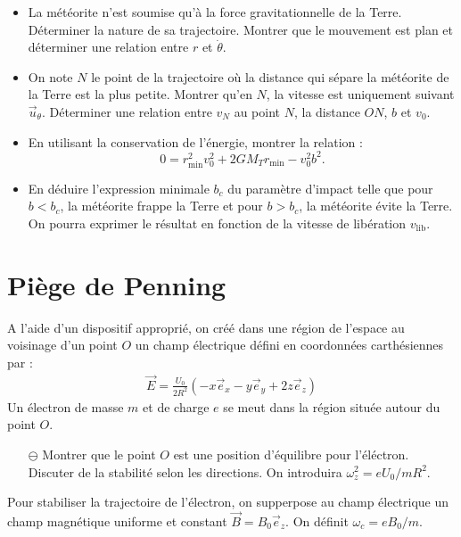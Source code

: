 \documentclass{report}
\begin{document}
\begin{itemize}
\item La météorite n'est soumise qu'à la force gravitationnelle de la Terre. Déterminer la nature de sa trajectoire. Montrer que le mouvement est plan et déterminer une relation entre $r$ et $\dot{\theta}$.
\item On note $N$ le point de la trajectoire où la distance qui sépare la météorite de la Terre est la plus petite. Montrer qu'en $N$, la vitesse est uniquement suivant $\vec{u}_\theta$. Déterminer une relation entre $v_N$ au point $N$, la distance $ON$, $b$ et $v_0$.
\item En utilisant la conservation de l'énergie, montrer la relation :
$$
0=r^2_\mathrm{min}v_0^2+2GM_Tr_\mathrm{min}-v_0^2b^2.
$$
\item En déduire l'expression minimale $b_c$ du paramètre d'impact telle que pour $b<b_c$, la météorite frappe la Terre et pour $b>b_c$, la météorite évite la Terre. On pourra exprimer le résultat en fonction de la vitesse de libération $v_\mathrm{lib}$.
\end{itemize}

\newpage

\section*{Piège de Penning}

A l'aide d'un dispositif approprié, on créé dans une région de l'espace au voisinage d'un point $O$ un champ électrique défini en coordonnées carthésiennes par :
\begin{align*}
	\vec{E}=\frac{U_0}{2R^2}\left(-x\vec{e}_x-y\vec{e}_y+2z\vec{e}_z \right) 
\end{align*}
Un électron de masse $m$ et de charge $e$ se meut dans la région située autour du point $O$.
\begin{itemize}

	\item[$\ominus$] Montrer que le point $O$ est une position d'équilibre pour l'éléctron. Discuter de la stabilité selon les directions. On introduira $\omega_z^2=eU_0/mR^2$.
	
\end{itemize}

Pour stabiliser la trajectoire de l'électron, on supperpose au champ électrique un champ magnétique uniforme et constant $\vec{B}=B_0\vec{e}_z$. On définit $\omega_c=eB_0/m$. 
\end{document}

